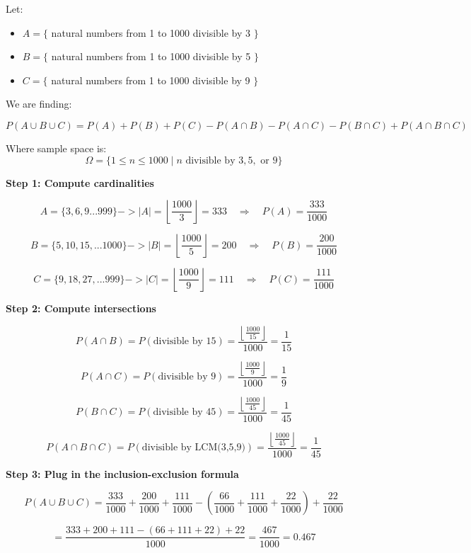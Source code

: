 \documentclass{article}
\begin{document}
Let:
\begin{itemize}
    \item $A = \{$  natural numbers from 1 to 1000 divisible by 3 $\}$
    \item $B = \{$ natural numbers from 1 to 1000  divisible by 5 $\}$
    \item $C = \{$ natural numbers from 1 to 1000 divisible by 9 $\}$
\end{itemize}

We are finding:

\[
P(A \cup B \cup C) = P(A) + P(B) + P(C) - P(A \cap B ) - P(A \cap C ) - P(B \cap C ) + P(A \cap B \cap C)
\]

Where sample space is:
\[
\Omega = \{1 \leq n \leq 1000 \mid n \text{ divisible by } 3, 5, \text{ or } 9\}
\]


\textbf{Step 1: Compute cardinalities}

\[
A= \{3,6,9...999\} ->|A| = \left\lfloor \frac{1000}{3} \right\rfloor = 333
\quad\Rightarrow\quad
P(A) = \frac{333}{1000}
\]

\[
B= \{5,10,15,...1000\}->|B| = \left\lfloor \frac{1000}{5} \right\rfloor = 200
\quad\Rightarrow\quad
P(B) = \frac{200}{1000}
\]

\[
C= \{9,18,27,...999\}-> |C| = \left\lfloor \frac{1000}{9} \right\rfloor = 111
\quad\Rightarrow\quad
P(C) = \frac{111}{1000}
\]

\textbf{Step 2: Compute intersections}

\[
P(A \cap B ) = P(\text{divisible by 15}) = \frac{\left\lfloor \frac{1000}{15} \right\rfloor}{1000} = \frac{1}{15}
\]

\[
P(A \cap C ) = P(\text{divisible by 9}) = \frac{\left\lfloor \frac{1000}{9} \right\rfloor}{1000} = \frac{1}{9}
\]


\[
P(B \cap C ) =P(\text{divisible by 45}) = \frac{\left\lfloor \frac{1000}{45} \right\rfloor}{1000} = \frac{1}{45}
\]

\[
P(A \cap B \cap C) = P(\text{divisible by LCM(3,5,9)}) = \frac{\left\lfloor \frac{1000}{45} \right\rfloor}{1000} = \frac{1}{45}
\]

\textbf{Step 3: Plug in the inclusion-exclusion formula}


\[
P(A \cup B \cup C) = \frac{333}{1000} + \frac{200}{1000} + \frac{111}{1000}
- \left(\frac{66}{1000} + \frac{111}{1000} + \frac{22}{1000}\right)
+ \frac{22}{1000}
\]

\[
= \frac{333 + 200 + 111 - (66 + 111+22)+22 }{1000} = \frac{467}{1000} = 0.467 
\]
\end{document}
